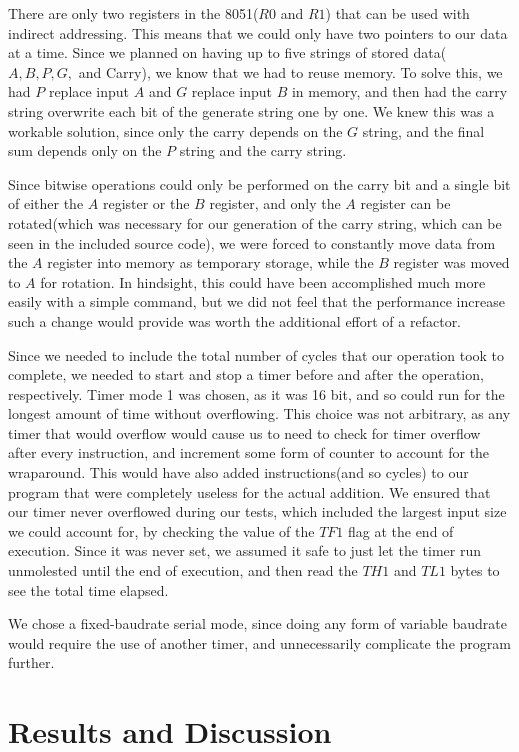 \documentclass[journal]{IEEEtran}
\begin{document}
There are only two registers in the 8051($R0$ and $R1$) that can be used with
indirect addressing. This means that we could only have two pointers to our data
at a time. Since we planned on having up to five strings of stored
data($A, B, P, G,$ and Carry), we know that we had to reuse memory. To solve this,
we had $P$ replace input $A$ and $G$ replace input $B$ in memory, and then had the
carry string overwrite each bit of the generate string one by one. We knew this
was a workable solution, since only the carry depends on the $G$ string, and the
final sum depends only on the $P$ string and the carry string.

Since bitwise operations could only be performed on the carry bit and a single
bit of either the $A$ register or the $B$ register, and only the $A$ register
can be rotated(which was necessary for our generation of the carry string,
which can be seen in the included source code), we were forced to constantly
move data from the $A$ register into memory as temporary storage, while the $B$
register was moved to $A$ for rotation. In hindsight, this could have been
accomplished much more easily with a simple  command, but we did
not feel that the performance increase such a change would provide was worth the
additional effort of a refactor.

Since we needed to include the total number of cycles that our operation took
to complete, we needed to start and stop a timer before and after the operation,
respectively. Timer mode 1 was chosen, as it was 16 bit, and so could run for
the longest amount of time without overflowing. This choice was not arbitrary,
as any timer that would overflow would cause us to need to check for timer
overflow after every instruction, and increment some form of counter to account
for the wraparound. This would have also added instructions(and so cycles)
to our program that were completely useless for the actual addition. We ensured
that our timer never overflowed during our tests, which included the largest
input size we could account for, by checking the value of the $TF1$ flag at the
end of execution. Since it was never set, we assumed it safe to just let the
timer run unmolested until the end of execution, and then read the $TH1$ and
$TL1$ bytes to see the total time elapsed.

We chose a fixed-baudrate serial mode, since doing any form of variable
baudrate would require the use of another timer, and unnecessarily complicate
the program further.

\section{Results and Discussion}\label{sec:discuss}
\end{document}
